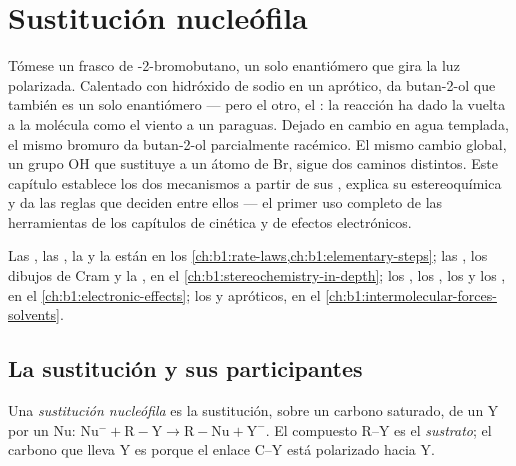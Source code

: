 \chapter{Sustitución nucleófila}\label{ch:b1:nucleophilic-substitution}

Tómese un frasco de -2-bromobutano, un solo enantiómero que gira
la luz polarizada. Calentado con hidróxido de sodio en un  aprótico, da butan-2-ol que también es un solo enantiómero --- pero
el otro, el : la reacción ha dado la vuelta a la molécula como el
viento a un paraguas. Dejado en cambio en agua templada, el mismo bromuro
da butan-2-ol parcialmente racémico. El mismo cambio global, un grupo OH
que sustituye a un átomo de Br, sigue dos caminos distintos. Este
capítulo establece los dos mecanismos a partir de sus ,
explica su estereoquímica y da las reglas que deciden entre ellos --- el
primer uso completo de las herramientas de los capítulos de cinética y
de efectos electrónicos.

\begin{recall}
Las , las , la  y la  están en los
\cref{ch:b1:rate-laws,ch:b1:elementary-steps}; las , los
dibujos de Cram y la , en el
\cref{ch:b1:stereochemistry-in-depth}; los , los ,
los  y los , en el
\cref{ch:b1:electronic-effects}; los  y apróticos, en
el \cref{ch:b1:intermolecular-forces-solvents}.
\end{recall}

\section{La sustitución y sus participantes}

\begin{definition}\label{def:b1:nucleophilic-substitution:substitution}
Una \emph{sustitución nucleófila} es la
sustitución, sobre un carbono saturado, de un  Y por un
 Nu: $\mathrm{Nu^-} + \mathrm{R{-}Y} \to \mathrm{R{-}Nu} +
\mathrm{Y^-}$. El compuesto R--Y es el \emph{sustrato};
el carbono que lleva Y es  porque el enlace C--Y está
polarizado hacia Y.
\end{definition}

